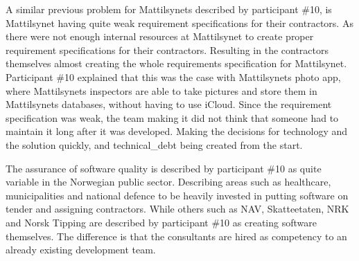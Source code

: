 
A similar previous problem for Mattilsynets described by participant \#10, is Mattilsynet having quite weak requirement specifications for their contractors. As there were not enough internal resources at Mattilsynet to create proper requirement specifications for their contractors. Resulting in the contractors themselves almost creating the whole requirements specification for Mattilsynet. Participant \#10 explained that this was the case with Mattilsynets photo app, where Mattilsynets inspectors are able to take pictures and store them in Mattilsynets databases, without having to use iCloud. Since the requirement specification was weak, the team making it did not think that someone had to maintain it long after it was developed. Making the decisions for technology and the solution quickly, and \gls{technical_debt} being created from the start.


The assurance of software quality is described by participant \#10 as quite variable in the Norwegian public sector. Describing areas such as healthcare, municipalities and national defence to be heavily invested in putting software on tender and assigning contractors. While others such as NAV, Skatteetaten, NRK and Norsk Tipping are described by participant \#10 as creating software themselves. The difference is that the consultants are hired as competency to an already existing development team.

